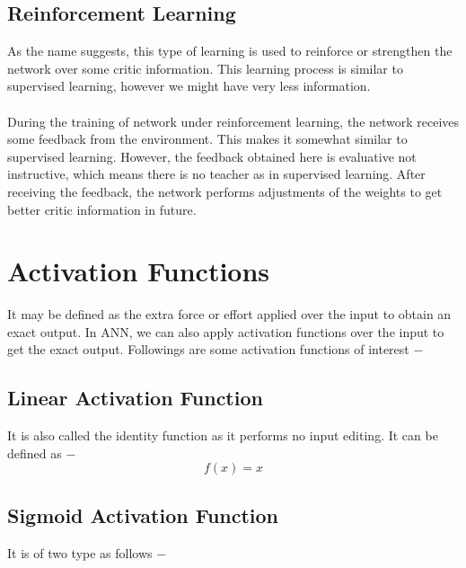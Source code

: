 \documentclass{report}
\begin{document}

\subsection{Reinforcement Learning}

As the name suggests, this type of learning is used to reinforce or strengthen the network over some critic information. This learning process is similar to supervised learning, however we might have very less information.
\paragraph{}
During the training of network under reinforcement learning, the network receives some feedback from the environment. This makes it somewhat similar to supervised learning. However, the feedback obtained here is evaluative not instructive, which means there is no teacher as in supervised learning. After receiving the feedback, the network performs adjustments of the weights to get better critic information in future.



\section{Activation Functions}
It may be defined as the extra force or effort applied over the input to obtain an exact output. In ANN, we can also apply activation functions over the input to get the exact output. Followings are some activation functions of interest −

\subsection{Linear Activation Function}
It is also called the identity function as it performs no input editing. It can be defined as −
\[f(x) = x\]

\subsection{Sigmoid Activation Function}
It is of two type as follows −
\end{document}
